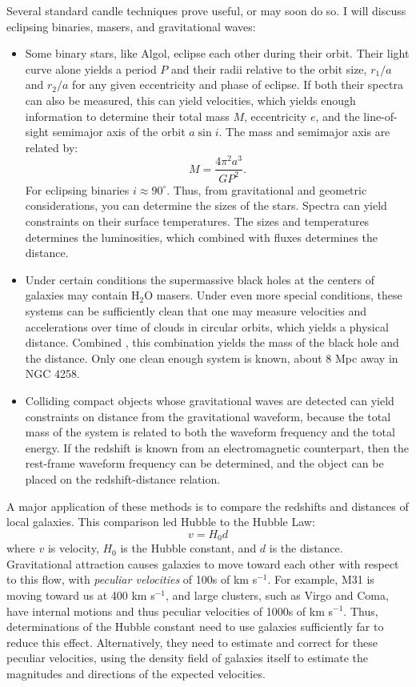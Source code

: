 Several standard candle techniques prove useful, or may soon do so. I
will discuss eclipsing binaries, masers, and gravitational waves:
\begin{itemize}
\item Some binary stars, like Algol, eclipse each other during their
orbit. Their light curve alone yields a period $P$ and their radii
relative to the orbit size, $r_1/a$ and $r_2/a$ for any given
eccentricity and phase of eclipse. If both their spectra can also be
measured, this can yield velocities, which yields enough information
to determine their total mass $M$, eccentricity $e$, and the
line-of-sight semimajor axis of the orbit $a \sin i$. The mass and
semimajor axis are related by:
\begin{equation}
M = \frac{4\pi^2 a^3}{GP^2}.
\end{equation}
For eclipsing binaries $i\approx 90^\circ$.  Thus, from gravitational
and geometric considerations, you can determine the sizes of the
stars. Spectra can yield constraints on their surface
temperatures. The sizes and temperatures determines the luminosities,
which combined with fluxes determines the distance.
\item Under certain conditions the supermassive
black holes at the centers of galaxies may contain H$_2$O
masers. Under even more special conditions, these systems can be
sufficiently clean that one may measure velocities and accelerations
over time of clouds in circular orbits, which yields a physical
distance. Combined , this combination yields
the mass of the black hole and the distance. Only one clean enough
system is known, about 8 Mpc away in NGC 4258.
\item Colliding compact objects whose gravitational waves are detected can
yield constraints on distance from the gravitational waveform, because
the total mass of the system is related to both the waveform frequency
and the total energy. If the redshift is known from an electromagnetic
counterpart, then the rest-frame waveform frequency can be determined,
and the object can be placed on the redshift-distance relation.
\end{itemize}

A major application of these methods is to compare the redshifts and
distances of local galaxies. This comparison led Hubble to the Hubble
Law:
\begin{equation}
v = H_0 d
\end{equation}
where $v$ is velocity, $H_0$ is the Hubble constant, and $d$ is the
distance. Gravitational attraction causes galaxies to move toward each
other with respect to this flow, with {\it peculiar velocities} of
100s of km s$^{-1}$. For example, M31 is moving toward us at 400 km
s$^{-1}$, and large clusters, such as Virgo and Coma, have internal
motions and thus peculiar velocities of 1000s of km s$^{-1}$. Thus,
determinations of the Hubble constant need to use galaxies
sufficiently far to reduce this effect. Alternatively, they need to
estimate and correct for these peculiar velocities, using the density
field of galaxies itself to estimate the magnitudes and directions of
the expected velocities.

